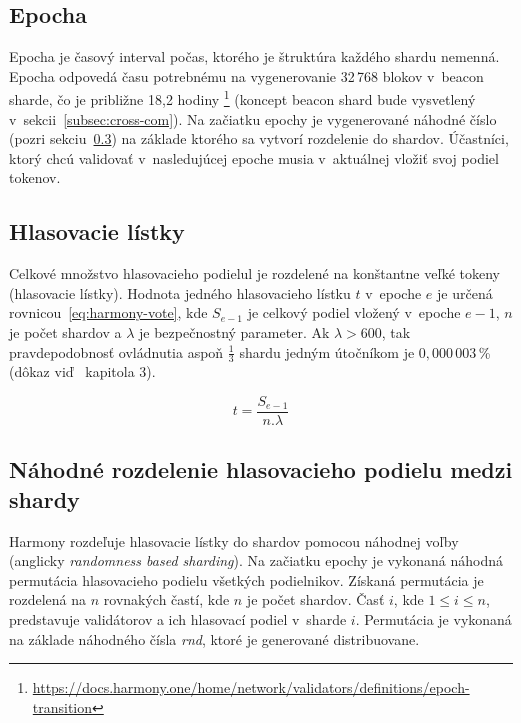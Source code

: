 \subsection{Epocha}\label{subsec:epoch}
Epocha je časový interval počas, ktorého je štruktúra každého shardu nemenná. Epocha odpovedá času potrebnému na vygenerovanie 32\,768 blokov v~beacon sharde, čo je približne 18,2 hodiny%
\footnote{\url{https://docs.harmony.one/home/network/validators/definitions/epoch-transition}} (koncept beacon shard bude vysvetlený v~sekcii~\ref{subsec:cross-com}). Na začiatku epochy je vygenerované náhodné číslo (pozri sekciu~\ref{subsec:rnd}) na základe ktorého sa vytvorí rozdelenie do shardov. Účastníci, ktorý chcú validovať v~nasledujúcej epoche musia v~aktuálnej vložiť svoj podiel tokenov.


\subsection{Hlasovacie lístky}\label{subsec:harmony-token}
Celkové množstvo hlasovacieho podielul je rozdelené na konštantne veľké tokeny (hlasovacie lístky). Hodnota jedného hlasovacieho lístku $t$ v~epoche $e$ je určená rovnicou~\ref{eq:harmony-vote}, kde $S_{e-1}$ je celkový podiel vložený v~epoche $e-1$, $n$ je počet shardov a $\lambda$ je bezpečnostný parameter. Ak $\lambda > 600$, tak pravdepodobnosť ovládnutia aspoň $\frac{1}{3}$ shardu jedným útočníkom je $0,000\,003$\,\% (dôkaz viď~\cite{harmonyDoc} kapitola 3).

\begin{equation}\label{eq:harmony-vote}
	t = \frac{S_{e-1}}{n . \lambda}
\end{equation}

\subsection{Náhodné rozdelenie hlasovacieho podielu medzi shardy}\label{subsec:rnd}
Harmony rozdeľuje hlasovacie lístky do shardov pomocou náhodnej voľby (anglicky \textit{randomness based sharding}). Na začiatku epochy je vykonaná náhodná permutácia hlasovacieho podielu všetkých podielnikov. Získaná permutácia je rozdelená na $n$ rovnakých častí, kde $n$ je počet shardov. Časť $i$, kde $1 \leq i \leq n$, predstavuje validátorov a ich hlasovací podiel v~sharde $i$. Permutácia je vykonaná na základe náhodného čísla \textit{rnd}, ktoré je generované distribuovane.

